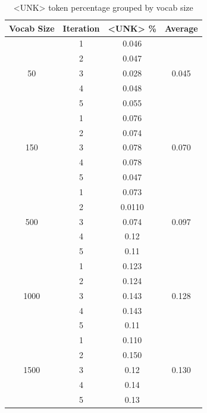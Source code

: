 \documentclass[11pt]{article}
\newlength\Size
\begin{document}
\begin{table}[H]
    \centering
    \begin{tabular}{|c|c|c|c|}
    \hline
        Vocab Size & Iteration & <UNK> \% & Average \\ \hline
         \multirow{5}{*}{50} & 1 & 0.046 & \multirow{5}{*}{0.045} \\ \cline{2-3}
         & 2 & 0.047 & \\ \cline{2-3}
         & 3 & 0.028 & \\ \cline{2-3}
         & 4 & 0.048 & \\ \cline{2-3}
         & 5 & 0.055 & \\ \hline
         \multirow{5}{*}{150} & 1 & 0.076 & \multirow{5}{*}{0.070} \\ \cline{2-3}
         & 2 & 0.074 & \\ \cline{2-3}
         & 3 & 0.078 & \\ \cline{2-3}
         & 4 & 0.078 & \\ \cline{2-3}
         & 5 & 0.047 & \\ \hline
         \multirow{5}{*}{500} & 1 & 0.073 & \multirow{5}{*}{0.097} \\ \cline{2-3}
         & 2 & 0.0110 & \\ \cline{2-3}
         & 3 & 0.074 & \\ \cline{2-3}
         & 4 & 0.12 & \\ \cline{2-3}
         & 5 & 0.11 & \\ \hline
         \multirow{5}{*}{1000} & 1 & 0.123 & \multirow{5}{*}{0.128} \\ \cline{2-3}
         & 2 & 0.124 & \\ \cline{2-3}
         & 3 & 0.143 & \\ \cline{2-3}
         & 4 & 0.143 & \\ \cline{2-3}
         & 5 & 0.11 & \\ \hline
         \multirow{5}{*}{1500} & 1 & 0.110 & \multirow{5}{*}{0.130} \\ \cline{2-3}
         & 2 & 0.150 & \\ \cline{2-3}
         & 3 & 0.12 & \\ \cline{2-3}
         & 4 & 0.14 & \\ \cline{2-3}
         & 5 & 0.13 & \\ \hline
    \end{tabular}
    \caption{<UNK> token percentage grouped by vocab size}
    \label{tab:unk}
\end{table}
\end{document}
